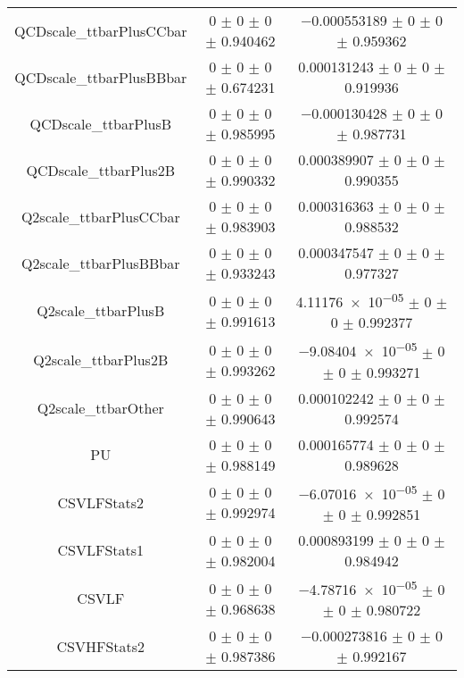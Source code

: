 \begin{table}
\begin{tabular}{ccc}
QCDscale\_ttbarPlusCCbar 	& \num{0} $\pm$ \num{0} $\pm$ \num{0} $\pm$ \num{0.940462} 	& \num{-0.000553189} $\pm$ \num{0} $\pm$ \num{0} $\pm$ \num{0.959362}\\
QCDscale\_ttbarPlusBBbar 	& \num{0} $\pm$ \num{0} $\pm$ \num{0} $\pm$ \num{0.674231} 	& \num{0.000131243} $\pm$ \num{0} $\pm$ \num{0} $\pm$ \num{0.919936}\\
QCDscale\_ttbarPlusB 	& \num{0} $\pm$ \num{0} $\pm$ \num{0} $\pm$ \num{0.985995} 	& \num{-0.000130428} $\pm$ \num{0} $\pm$ \num{0} $\pm$ \num{0.987731}\\
QCDscale\_ttbarPlus2B 	& \num{0} $\pm$ \num{0} $\pm$ \num{0} $\pm$ \num{0.990332} 	& \num{0.000389907} $\pm$ \num{0} $\pm$ \num{0} $\pm$ \num{0.990355}\\
Q2scale\_ttbarPlusCCbar 	& \num{0} $\pm$ \num{0} $\pm$ \num{0} $\pm$ \num{0.983903} 	& \num{0.000316363} $\pm$ \num{0} $\pm$ \num{0} $\pm$ \num{0.988532}\\
Q2scale\_ttbarPlusBBbar 	& \num{0} $\pm$ \num{0} $\pm$ \num{0} $\pm$ \num{0.933243} 	& \num{0.000347547} $\pm$ \num{0} $\pm$ \num{0} $\pm$ \num{0.977327}\\
Q2scale\_ttbarPlusB 	& \num{0} $\pm$ \num{0} $\pm$ \num{0} $\pm$ \num{0.991613} 	& \num{4.11176e-05} $\pm$ \num{0} $\pm$ \num{0} $\pm$ \num{0.992377}\\
Q2scale\_ttbarPlus2B 	& \num{0} $\pm$ \num{0} $\pm$ \num{0} $\pm$ \num{0.993262} 	& \num{-9.08404e-05} $\pm$ \num{0} $\pm$ \num{0} $\pm$ \num{0.993271}\\
Q2scale\_ttbarOther 	& \num{0} $\pm$ \num{0} $\pm$ \num{0} $\pm$ \num{0.990643} 	& \num{0.000102242} $\pm$ \num{0} $\pm$ \num{0} $\pm$ \num{0.992574}\\
PU 	& \num{0} $\pm$ \num{0} $\pm$ \num{0} $\pm$ \num{0.988149} 	& \num{0.000165774} $\pm$ \num{0} $\pm$ \num{0} $\pm$ \num{0.989628}\\
CSVLFStats2 	& \num{0} $\pm$ \num{0} $\pm$ \num{0} $\pm$ \num{0.992974} 	& \num{-6.07016e-05} $\pm$ \num{0} $\pm$ \num{0} $\pm$ \num{0.992851}\\
CSVLFStats1 	& \num{0} $\pm$ \num{0} $\pm$ \num{0} $\pm$ \num{0.982004} 	& \num{0.000893199} $\pm$ \num{0} $\pm$ \num{0} $\pm$ \num{0.984942}\\
CSVLF 	& \num{0} $\pm$ \num{0} $\pm$ \num{0} $\pm$ \num{0.968638} 	& \num{-4.78716e-05} $\pm$ \num{0} $\pm$ \num{0} $\pm$ \num{0.980722}\\
CSVHFStats2 	& \num{0} $\pm$ \num{0} $\pm$ \num{0} $\pm$ \num{0.987386} 	& \num{-0.000273816} $\pm$ \num{0} $\pm$ \num{0} $\pm$ \num{0.992167}\\

\end{tabular}
\end{table}
